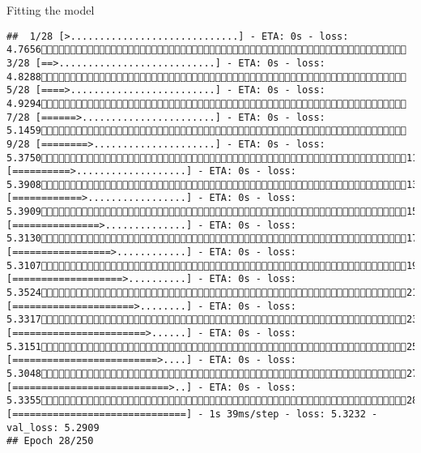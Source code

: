 \documentclass[
  ignorenonframetext,
]{beamer}
\begin{document}
\begin{frame}[fragile]{Fitting the model}
\begin{verbatim}
##  1/28 [>.............................] - ETA: 0s - loss: 4.7656 3/28 [==>...........................] - ETA: 0s - loss: 4.8288 5/28 [====>.........................] - ETA: 0s - loss: 4.9294 7/28 [======>.......................] - ETA: 0s - loss: 5.1459 9/28 [========>.....................] - ETA: 0s - loss: 5.375011/28 [==========>...................] - ETA: 0s - loss: 5.390813/28 [============>.................] - ETA: 0s - loss: 5.390915/28 [===============>..............] - ETA: 0s - loss: 5.313017/28 [=================>............] - ETA: 0s - loss: 5.310719/28 [===================>..........] - ETA: 0s - loss: 5.352421/28 [=====================>........] - ETA: 0s - loss: 5.331723/28 [=======================>......] - ETA: 0s - loss: 5.315125/28 [=========================>....] - ETA: 0s - loss: 5.304827/28 [===========================>..] - ETA: 0s - loss: 5.335528/28 [==============================] - 1s 39ms/step - loss: 5.3232 - val_loss: 5.2909
## Epoch 28/250

\end{verbatim}
\end{frame}
\end{document}
